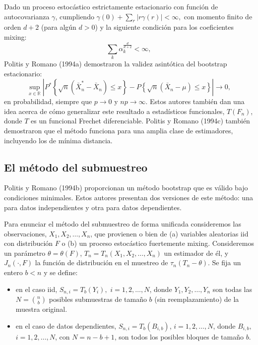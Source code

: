 \documentclass[]{book}
\theoremstyle{definition}
\theoremstyle{definition}
\theoremstyle{definition}
\theoremstyle{remark}
\begin{document}
Dado un proceso estocástico estrictamente estacionario con función de
autocovarianza \(\gamma\), cumpliendo
\(\gamma (0)+\sum_{r}\left\vert r\gamma (r)\right\vert <\infty ,\) con
momento finito de orden \(d+2\) (para algún \(d>0\)) y la siguiente
condición para los coeficientes mixing:
\[\sum_{k}\alpha _{k}^{\frac{d}{d+2}}<\infty ,\]Politis y Romano (1994a)
demostraron la validez asintótica del bootstrap estacionario:
\[\sup_{x\in \mathbb{R}}\left\vert P^{\ast}\left\{ \sqrt{n}(\bar{X}_n^{\ast
}-\bar{X}_n)\leq x\right\} -P\left\{ \sqrt{n}(\bar{X}_n-\mu )\leq
x\right\} \right\vert \rightarrow 0,\]en probabilidad, siempre que
\(p\rightarrow 0\) y \(np\rightarrow \infty\). Estos autores también dan
una idea acerca de cómo generalizar este resultado a estadísticos
funcionales, \(T(F_n)\), donde \(T\) es un funcional Frechet
diferenciable. Politis y Romano (1994c) también demostraron que el
método funciona para una amplia clase de estimadores, incluyendo los de
mínima distancia.

\subsection{El método del submuestreo}\label{el-metodo-del-submuestreo}

Politis y Romano (1994b) proporcionan un método bootstrap que es válido
bajo condiciones minimales. Estos autores presentan dos versiones de
este método: una para datos independientes y otra para datos
dependientes.

Para enunciar el método del submuestreo de forma unificada consideremos
las observaciones, \(X_1,X_2,\ldots ,X_n\), que provienen o bien de (a)
variables aleatorias iid con distribución \(F\) o (b) un proceso
estocástico fuertemente mixing. Consideremos un parámetro
\(\theta =\theta (F)\), \(T_n=T_n(X_1,X_2,\ldots ,X_n)\) un estimador de
él, y \(J_n(\cdot ,F)\) la función de distribución en el muestreo de
\(\tau _n(T_n-\theta )\). Se fija un entero \(b<n\) y se define:

\begin{itemize}
\item
  en el caso iid, \(S_{n,i}=T_{b}(Y_i),\) \(i=1,2,\ldots ,N\), donde
  \(Y_1,Y_2,\ldots ,Y_n\) son todas las \(N=\binom{n}{b}\) posibles
  submuestras de tamaño \(b\) (sin reemplazamiento) de la muestra
  original.
\item
  en el caso de datos dependientes, \(S_{n,i}=T_{b}(B_{i,b})\),
  \(i=1,2,\ldots ,N\), donde \(B_{i,b},\) \(i=1,2,\ldots ,N\), con
  \(N=n-b+1\), son todos los posibles bloques de tamaño \(b\).
\end{itemize}
\end{document}
